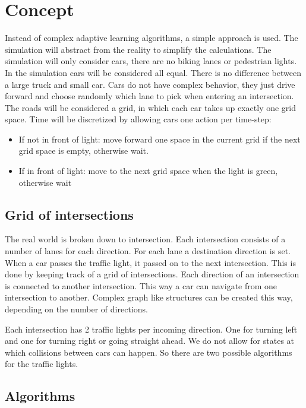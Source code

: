 \documentclass[a4paper,11pt]{article}
\begin{document}
\section{Concept}\label{sec:concept}

Instead of complex adaptive learning algorithms, a simple approach is used.
The simulation will abstract from the reality to simplify the calculations.
The simulation will only consider cars, there are no biking lanes or pedestrian lights.
In the simulation cars will be considered all equal.
There is no difference between a large truck and small car.
Cars do not have complex behavior, they just drive forward and choose randomly which lane to pick when
entering an intersection.
The roads will be considered a grid, in which each car takes up exactly one grid space.
Time will be discretized by allowing cars one action per time-step:
\begin{itemize}
 \item If not in front of light: move forward one space in the current grid if the next grid space is empty, otherwise wait.
 \item If in front of light: move to the next grid space when the light is green, otherwise wait
\end{itemize}


\subsection{Grid of intersections}
The real world is broken down to intersection.
Each intersection consists of a number of lanes for each direction.
For each lane a destination direction is set.
When a car passes the traffic light, it passed on to the next intersection.
This is done by keeping track of a grid of intersections.
Each direction of an intersection is connected to another intersection.
This way a car can navigate from one intersection to another.
Complex graph like structures can be created this way, depending on the number of
directions.

Each intersection has 2 traffic lights per incoming direction.
One for turning left and one for turning right or going straight ahead.
We do not allow for states at which collisions between cars can happen.
So there are two possible algorithms for the traffic lights.

\subsection{Algorithms}
\end{document}
